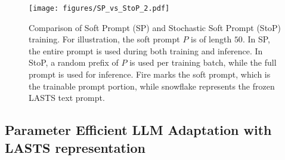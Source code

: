 \begin{figure*}[t]
\centering
\texttt{[image: figures/SP\_vs\_StoP\_2.pdf]}
\caption{Comparison of Soft Prompt (SP) and Stochastic Soft Prompt (StoP) training. For illustration, the soft prompt $P$ is of length $50$. In SP, the entire prompt is used during both training and inference. In StoP, a random prefix of $P$ is used per training batch, while the full prompt is used for inference. Fire marks the soft prompt, which is the trainable prompt portion, while snowflake represents the frozen LASTS text prompt.}
\label{fig:ssp_vs_sp}
\end{figure*} 






\subsection{Parameter Efficient LLM Adaptation with LASTS representation}
\label{sec:peft_with_lasts}



